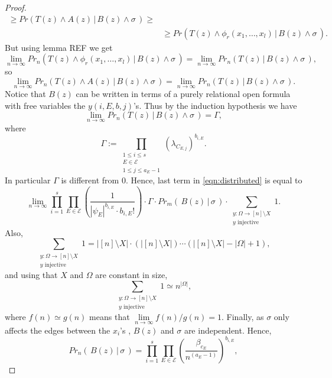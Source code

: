 \documentclass[11pt,notitlepage]{report}
\theoremstyle{definition}
\theoremstyle{remark}
\newcommand{\Ln}{\lim\limits_{n\to \infty}}
\begin{document}
\begin{proof}
\begin{align*}
	\geq Pr( T(z) \wedge A(z)  \, | \, B(z) \wedge \sigma \, ) \geq \\ 
	& \geq Pr(T(z) \wedge \phi_r(x_1,\dots,x_l) 
	\, | \, B(z) \wedge \sigma \, ).
	\end{align*}
	But using lemma REF we get
	\[ \Ln  Pr_n(T(z) \wedge \phi_r(x_1,\dots,x_l)
	\, | \, B(z) \wedge \sigma \, ) = 
	\Ln Pr_n(T(z)\, | \, B(z) \wedge \sigma \, ), \]
	so
	\begin{equation} 
	\Ln  Pr_n(T(z) \wedge A(z)
	\, | \, B(z) \wedge \sigma \, ) = 
	\Ln Pr_n(T(z)\, | \, B(z) \wedge \sigma \, ). 
	\end{equation}
 	Notice that $B(z)$ can be written in terms of a purely relational
 	open formula with free variables the $y(i,E,b,j)$'s.
 	Thus by the induction hypothesis we have
 	\[\Ln Pr_n( T(z)  \, | \, B(z) \wedge \sigma \, )= \Gamma, \]
 	where 
 	\begin{equation}\label{eqn:gammadef}
 	\Gamma:=\prod_{\substack{1\leq i \leq s \\ E\in \mathcal{E}\\
 	1\leq j \leq a_E - 1 }} (\lambda_{C_{E,j}})^{b_{i,E}}.
 	\end{equation}
 	In particular $\Gamma$ is different from $0$.
 	Hence, last term in \cref{eqn:distributed} is equal to
 	\begin{equation} \label{eqn:distributed2}
 	\Ln	\prod_{i=1}^{s}
 		\prod_{E\in \mathcal{E}} \left(\frac{1}{|\psi_E|^{b_{i,E}} \cdot b_{i,E}!}\right) 
 		\cdot \Gamma \cdot
 		Pr_m(\, B(z) \, | \, \sigma \, )
 		\cdot \sum_{\substack{y:\Omega \rightarrow [n]\setminus X\\ y \text{ injective}}} 1.
 	\end{equation} 
 	Also,
 	\[\sum_{\substack{y:\Omega \rightarrow [n]\setminus X\\ y \text{ injective}}} 1 =|[n]\setminus X|\cdot (|[n]\setminus X|)\cdots 
 	(|[n]\setminus X|-|\Omega|+1), \]
 	and using that $X$ and $\Omega$ are constant in size,
 	\begin{equation}\label{eqn:sumones}
 	\sum_{\substack{y:\Omega \rightarrow [n]\setminus X\\ y \text{ injective}}} 1 \simeq n^{|\Omega|},
 	\end{equation}
 	where $f(n)\simeq g(n)$ means that $\Ln f(n)/g(n)=1$.
 	Finally, as $\sigma$ only affects the edges between the $x_i$'s
 	, $B(z)$ and $\sigma$ are independent. Hence,
 	\[ Pr_n(\, B(z) \, | \, \sigma \, ) = \prod_{i=1}^{s} 
 	\prod_{E\in \mathcal{E}} \left(\frac{\beta_{c_E}}{n^{(a_E -1)}}
 	\right)^{b_{i,E}},  \]

\end{proof}
\end{document}
